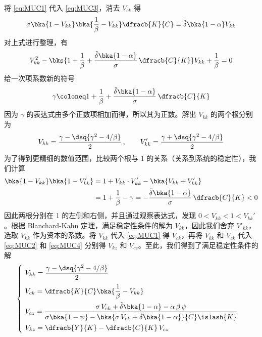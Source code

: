 将 \ref{eq:MUC1} 代入 \ref{eq:MUC3}，消去 \(V_{ck}\) 得
\begin{align*}
    \sigma\bka{1-V_{kk}}\bka{\dfrac1\beta-V_{kk}}\dfracb{K}{C}=\tilde\delta\bka{1-\alpha}V_{kk}
\end{align*}
对上式进行整理，有
\begin{equation*}
    V^2_{kk}-\bks{1+\dfrac1\beta+\dfrac{\tilde\delta\bka{1-\alpha}}\sigma\,\dfracb{C}{K}}V_{kk}+\dfrac1\beta=0
\end{equation*}
给一次项系数新的符号
\begin{equation}
    \gamma\coloneq1+\dfrac1\beta+\dfrac{\tilde\delta\bka{1-\alpha}}\sigma\,\dfracb{C}{K}\label{eq:gamma}
\end{equation}
因为 \(\gamma\) 的表达式由多个正数项相加而得，所以其为正数。解出 \(V_{kk}\) 的两个根分别为
\begin{align}
    V_{kk}=\dfrac{\gamma-\dsq{\gamma^2-4/\beta}}{2}\,,\qquad V_{kk}'=\dfrac{\gamma+\dsq{\gamma^2-4/\beta}}{2}\label{eq:Vkk}
\end{align}
为了得到更精细的数值范围，比较两个根与 1 的关系（关系到系统的稳定性），我们计算
\begin{align*}
    \bka{1-V_{kk}}\bka{1-V_{kk}'}&=1+V_{kk}\cdot V_{kk}'-\bka{V_{kk}+V_{kk}'}\\
    &=1+\dfrac1\beta-\gamma=-\dfrac{\tilde\delta\bka{1-\alpha}}\sigma\,\dfracb{C}{K}<0
\end{align*}
因此两根分别在 1 的左侧和右侧，并且通过观察表达式，发现 \(0<V_{kk}<1<V_{kk}'\)。根据 Blanchard-Kahn 定理，满足稳定性条件的解为 \(V_{kk}\)，因此我们舍弃 \(V'_{kk}\)，选取 \(V_{kk}\) 作为资本的系数。将 \(V_{kk}\) 代入 \ref{eq:MUC1} 得 \(V_{ck}\)，再将 \(V_{kk}\) 和 \(V_{ck}\) 代入 \ref{eq:MUC2} 和 \ref{eq:MUC4} 分别得 \(V_{kz}\) 和 \(V_{cz}\)。至此，我们得到了满足稳定性条件的解
\begin{equation}
    \begin{cases}
        \ V_{kk}=\dfrac{\gamma-\dsq{\gamma^2-4/\beta}}{2}\\[2ex]
        \ V_{ck}=\dfracb{K}{C}\bka{\dfrac1\beta-V_{kk}}\\[2ex]
        \ V_{cz}=\dfrac{\sigma\,V_{ck}+\tilde\delta\bka{1-\alpha}-\alpha\,\beta\,\psi}{\sigma\bka{1-\psi}-\bks{\sigma\,V_{ck}+\tilde\delta\bka{1-\alpha}}{\bar C}\islash{\bar K}}\\[2ex]
        \ V_{kz}=\dfracb{Y}{K}-\dfracb{C}{K}\, V_{cz}
    \end{cases}\label{eq:V}
\end{equation}

